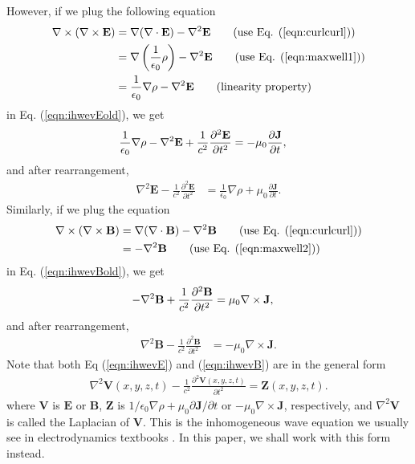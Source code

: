 \documentclass[11pt]{article}              %
\begin{document}
However, if we plug the following equation
\begin{align}
\nabla\times(\nabla\times{\mathbf E})&=\nabla(\nabla\cdot{\mathbf E})-\nabla^2{\mathbf E}\tag{use Eq. (\ref{eqn:curlcurl})}\\
&=\nabla\left(\frac{1}{\epsilon_0}\rho\right)-\nabla^2{\mathbf E}\tag{use Eq. (\ref{eqn:maxwell1})}\\
&=\frac{1}{\epsilon_0}\nabla\rho-\nabla^2{\mathbf E}\tag{linearity property}
\end{align}
in Eq. (\ref{eqn:ihwevEold}), we get
\begin{align}
    \frac{1}{\epsilon_0}\nabla\rho-\nabla^2{\mathbf E}+\frac{1}{c^2}\frac{\partial^2{\mathbf E}}{\partial t^2}&=-\mu_0\frac{\partial {\mathbf J}}{\partial t},\notag
\end{align}
and after rearrangement, 
\begin{align}
\nabla^2{\mathbf E}-\frac{1}{c^2}\frac{\partial^2{\mathbf E}}{\partial t^2}&=\frac{1}{\epsilon_0}\nabla\rho+\mu_0\frac{\partial{\mathbf J}}{\partial t}.\label{eqn:ihwevE}
\end{align}
Similarly, if we plug the equation
\begin{align}
\nabla\times(\nabla\times{\mathbf B})&=\nabla(\nabla\cdot{\mathbf B})-\nabla^2{\mathbf B}\tag{use Eq. (\ref{eqn:curlcurl})}\\
&=-\nabla^2{\mathbf B}\tag{use Eq. (\ref{eqn:maxwell2})}
\end{align}
in Eq. (\ref{eqn:ihwevBold}), we get
\begin{align}
    -\nabla^2{\mathbf B}+\frac{1}{c^2}\frac{\partial^2{\mathbf B}}{\partial t^2}&=\mu_0\nabla\times {\mathbf J},\notag
\end{align}
and after rearrangement,
\begin{align}    
\nabla^2{\mathbf B}-\frac{1}{c^2}\frac{\partial^2{\mathbf B}}{\partial t^2}&=-\mu_0\nabla\times {\mathbf J}.\label{eqn:ihwevB}
\end{align}
Note that both Eq (\ref{eqn:ihwevE}) and (\ref{eqn:ihwevB}) are in the general form 
\begin{align}
	\nabla^2 {\mathbf V}(x,y,z,t) -\frac{1}{c^2}\frac{\partial^2 {\mathbf V}(x,y,z,t)}{\partial t^2}={\mathbf Z}(x,y,z,t).\label{eqn:ihwev}
\end{align}
where ${\mathbf V}$ is $\mathbf E$ or $\mathbf B$, ${\mathbf Z}$ is ${1}/{\epsilon_0}\nabla\rho+\mu_0{\partial {\mathbf J}}/{\partial t}$ or $-\mu_0\nabla\times {\mathbf J}$, respectively, and $\nabla^2 \mathbf{V}$ is called the Laplacian of $\mathbf{V}$. This is the inhomogeneous wave equation we usually see in electrodynamics textbooks \cite {johnson1965field} \cite{lorrain1988electromagnetic}  \cite{westgard1995electrodynamics} \cite{brau2004modern} \cite{zangwill2013modern}. In this paper, we shall work with this form instead.
\end{document}

